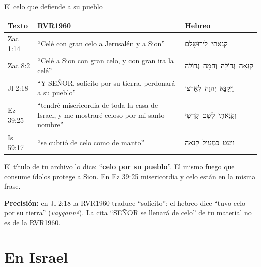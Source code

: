 \documentclass[hyperref={bookmarks=false},aspectratio=169]{beamer}
\newcommand{\heb}[1]{\mbox{\foreignlanguage{hebrew}{#1}}}
\newcommand{\SENOR}{S{\fontsize{0.78em}{1em}\selectfont EÑOR}}
\newcommand{\destacar}[1]{\textbf{\textcolor{azul}{#1}}}
\newcommand{\precision}[1]{{\footnotesize\color{gris}\textbf{Precisión:} #1}}
\begin{document}
\begin{frame}{El celo que defiende a su pueblo}
\scriptsize\renewcommand{\arraystretch}{1.18}
\begin{tabular}{@{}>{\RaggedRight\arraybackslash}p{1.6cm}>{\RaggedRight\arraybackslash}p{6.4cm}>{\RaggedRight\arraybackslash}p{3.8cm}@{}}
\toprule
\textbf{Texto} & \textbf{RVR1960} & \textbf{Hebreo} \\ \midrule
Zac 1:14 & ``Celé con gran celo a Jerusalén y a Sion'' & \heb{קִנֵּאתִי לִירוּשָׁלִַם} \\
Zac 8:2 & ``Celé a Sion con gran celo, y con gran ira la celé'' & \heb{קִנְאָה גְדוֹלָה וְחֵמָה גְדוֹלָה} \\
Jl 2:18 & ``Y \SENOR, solícito por su tierra, perdonará a su pueblo'' & \heb{וַיְקַנֵּא יְהוָה לְאַרְצוֹ} \\
Ez 39:25 & ``tendré misericordia de toda la casa de Israel, y me mostraré celoso por mi santo nombre'' & \heb{וְקִנֵּאתִי לְשֵׁם קָדְשִׁי} \\
Is 59:17 & ``se cubrió de celo como de manto'' & \heb{וַיַּעַט כַּמְעִיל קִנְאָה} \\
\bottomrule
\end{tabular}\par\medskip
\small\RaggedRight El título de tu archivo lo dice: ``\destacar{celo por su pueblo}''. El mismo fuego que consume ídolos protege a Sion. En Ez 39:25 misericordia y celo están en la misma frase.\par\smallskip
\precision{en Jl 2:18 la RVR1960 traduce ``solícito''; el hebreo dice ``tuvo celo por su tierra'' (\emph{vayqanné}). La cita ``\SENOR{} se llenará de celo'' de tu material no es de la RVR1960.}
\end{frame}

\section{En Israel}
\end{document}
